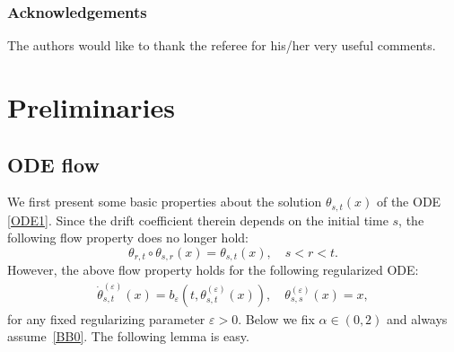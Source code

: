 \documentclass[JEP,XML,SOM,Unicode,published]{cedram}
\theoremstyle{plain}
\theoremstyle{definition}
\let\eps\varepsilon
\newcommand\1{{\mathbf{1}}}
\begin{document}
\subsubsection*{Acknowledgements}
The authors would like to thank the referee for his/her very useful comments.

\section{Preliminaries}
\label{SEC_PRELIM}
\subsection{ODE flow}
We first present some basic properties about the solution $\theta_{s,t}(x)$ of the ODE \eqref{ODE1}. Since the drift coefficient therein
depends on the initial time $s$, the following flow property does no longer hold:
\[
\theta_{r,t}\circ \theta_{s,r}(x)=\theta_{s,t}(x),\quad s<r<t.
\]
However, the above flow property holds for the following regularized ODE:
\begin{align}\label{ODE0}
\dot\theta^{(\eps)}_{s,t}(x)=b_\eps(t,\theta^{(\eps)}_{s,t}(x)),\quad \theta^{(\eps)}_{s,s}(x)=x,
\end{align}
for any fixed regularizing parameter $\eps>0 $.
Below we fix $\alpha\in(0,2)$ and always assume~\eqref{BB0}.
The following lemma is easy.
\end{document}
